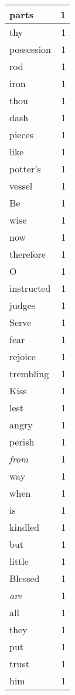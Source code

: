 \begin{center}
\begin{longtable}{l|r}
parts & 1 \\ \hline
thy & 1 \\ \hline
possession & 1 \\ \hline
rod & 1 \\ \hline
iron & 1 \\ \hline
thou & 1 \\ \hline
dash & 1 \\ \hline
pieces & 1 \\ \hline
like & 1 \\ \hline
potter's & 1 \\ \hline
vessel & 1 \\ \hline
Be & 1 \\ \hline
wise & 1 \\ \hline
now & 1 \\ \hline
therefore & 1 \\ \hline
O & 1 \\ \hline
instructed & 1 \\ \hline
judges & 1 \\ \hline
Serve & 1 \\ \hline
fear & 1 \\ \hline
rejoice & 1 \\ \hline
trembling & 1 \\ \hline
Kiss & 1 \\ \hline
lest & 1 \\ \hline
angry & 1 \\ \hline
perish & 1 \\ \hline
\emph{from} & 1 \\ \hline
way & 1 \\ \hline
when & 1 \\ \hline
is & 1 \\ \hline
kindled & 1 \\ \hline
but & 1 \\ \hline
little & 1 \\ \hline
Blessed & 1 \\ \hline
\emph{are} & 1 \\ \hline
all & 1 \\ \hline
they & 1 \\ \hline
put & 1 \\ \hline
trust & 1 \\ \hline
him & 1 \\ \hline
\end{longtable}
\end{center}



\normalsize



